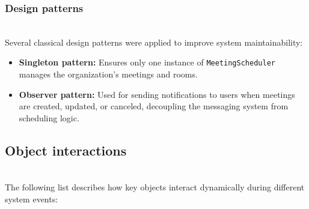 \subsubsection{Design patterns}\label{QRqrLjuxrm0LHjMb3Wb6g}
\\
Several classical design patterns were applied to improve system maintainability:

\begin{itemize}
\item
\protect{}\label{L8zYBNEPviMs-4xOoehYz}
\textbf{Singleton pattern:} Ensures only one instance of \texttt{MeetingScheduler} manages the organization's meetings and rooms.
\item
\protect{}\label{T87cd-ebLSjFfEzqeChVp}
\textbf{Observer pattern:} Used for sending notifications to users when meetings are created, updated, or canceled, decoupling the messaging system from scheduling logic.
\end{itemize}

\subsection{Object interactions}\label{8Om6tod1k1sZKR-Gh7WcH}
\\
The following list describes how key objects interact dynamically during different system events:

